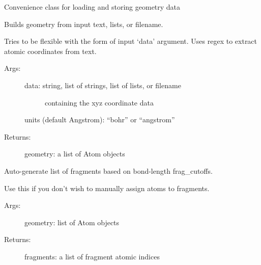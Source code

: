 \documentclass[letterpaper,10pt,english]{sphinxmanual}
\begin{document}
\begin{fulllineitems}
\label{\detokenize{globals:globals.geom.Atom}}
Convenience class for loading and storing geometry data

\end{fulllineitems}


\begin{fulllineitems}
\label{\detokenize{globals:globals.geom.load_geometry}}
Builds geometry from input text, lists, or filename.

Tries to be flexible with the form of input `data' argument. 
Uses regex to extract atomic coordinates from text.
\begin{description}
\item[{Args:}] \leavevmode\begin{description}
\item[{data: string, list of strings, list of lists, or filename}] \leavevmode
containing the xyz coordinate data

\end{description}

units (default Angstrom): ``bohr'' or ``angstrom''

\item[{Returns:}] \leavevmode
geometry: a list of Atom objects

\end{description}

\end{fulllineitems}


\begin{fulllineitems}
\label{\detokenize{globals:globals.geom.makefrag_auto}}
Auto-generate list of fragments based on bond-length frag\_cutoffs.

Use this if you don't wish to manually assign atoms to fragments.
\begin{description}
\item[{Args:}] \leavevmode
geometry: list of Atom objects

\item[{Returns:}] \leavevmode
fragments: a list of fragment atomic indices

\end{description}

\end{fulllineitems}
\end{document}
